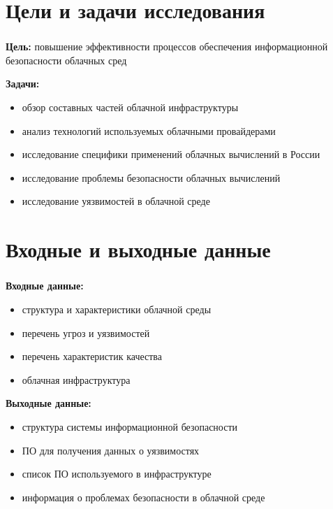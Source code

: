 
\frame[plain]{\titlepage} %


\section{Цели и задачи исследования}

\begin{frame}
\frametitle{\insertsection}

\textbf{Цель:} повышение эффективности процессов обеспечения информационной безопасности облачных сред

\vspace{\baselineskip}

\textbf{Задачи:}
\begin{itemize}
    \item обзор составных частей облачной инфраструктуры
    \item анализ технологий используемых облачными провайдерами
    \item исследование специфики применений облачных вычислений в России
    \item исследование проблемы безопасности облачных вычислений
    \item исследование уязвимостей в облачной среде
\end{itemize}
\end{frame}


\section{Входные и выходные данные}

\begin{frame}
\frametitle{\insertsection}

\textbf{Входные данные:}
\begin{itemize}
    \item структура и характеристики облачной среды
    \item перечень угроз и уязвимостей
    \item перечень характеристик качества
    \item облачная инфраструктура
\end{itemize}

\vspace{\baselineskip}

\textbf{Выходные данные:}
\begin{itemize}
    \item структура системы информационной безопасности
    \item ПО для получения данных о уязвимостях
    \item список ПО используемого в инфраструктуре
    \item информация о проблемах безопасности в облачной среде
\end{itemize}
\end{frame}

